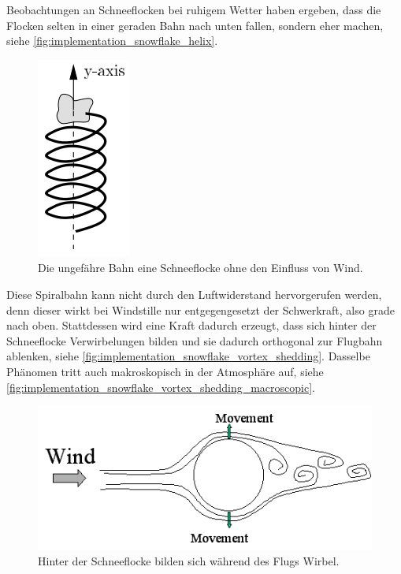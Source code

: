 Beobachtungen an Schneeflocken bei ruhigem Wetter haben ergeben, dass
die Flocken selten in einer geraden Bahn nach unten fallen, sondern
eher  machen, siehe
\autoref{fig:implementation_snowflake_helix}.

\begin{figure}[ht]
    \centering
    \includegraphics{images/snowflake_helix}
    \caption{Die ungefähre Bahn eine Schneeflocke ohne den Einfluss von Wind.}
    \label{fig:implementation_snowflake_helix}
\end{figure}

Diese Spiralbahn kann nicht durch den Luftwiderstand hervorgerufen
werden, denn dieser wirkt bei Windstille nur entgegengesetzt der
Schwerkraft, also grade nach oben. Stattdessen wird eine Kraft dadurch
erzeugt, dass sich hinter der Schneeflocke Verwirbelungen bilden und
sie dadurch orthogonal zur Flugbahn ablenken, siehe
\autoref{fig:implementation_snowflake_vortex_shedding}. Dasselbe
Phänomen tritt auch makroskopisch in der Atmosphäre auf, siehe
\autoref{fig:implementation_snowflake_vortex_shedding_macroscopic}.

\begin{figure}[ht]
    \centering
    \includegraphics{images/vortex_shedding}
    \caption{Hinter der Schneeflocke bilden sich während des Flugs Wirbel.}
    \label{fig:implementation_snowflake_vortex_shedding}
\end{figure}

